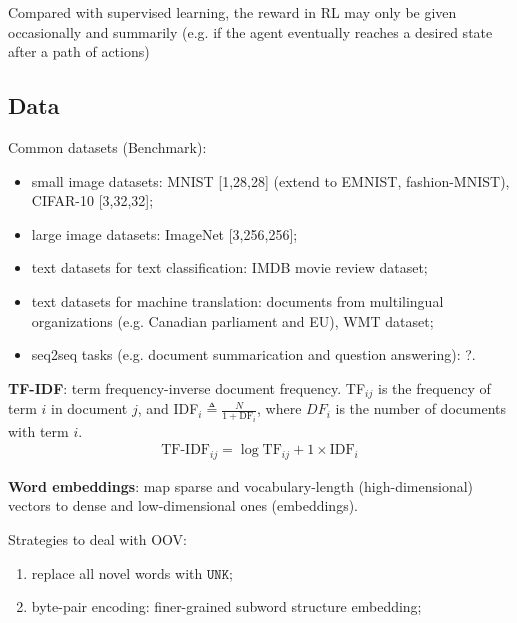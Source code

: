 Compared with supervised learning, the reward in RL may only be given occasionally and summarily
(e.g. if the agent eventually reaches a desired state after a path of actions)

\subsection{Data}

Common datasets (Benchmark):
\begin{itemize}
    \item small image datasets: MNIST [1,28,28] (extend to EMNIST, fashion-MNIST), CIFAR-10 [3,32,32];
    \item large image datasets: ImageNet [3,256,256];
    \item text datasets for text classification: IMDB movie review dataset;
    \item text datasets for machine translation: documents from multilingual organizations 
    (e.g. Canadian parliament and EU), WMT dataset;
    \item seq2seq tasks (e.g. document summarication and question answering): ?.
\end{itemize}

\textbf{TF-IDF}: term frequency-inverse document frequency.
TF$_{ij}$ is the frequency of term $i$ in document $j$, and 
IDF$_i\triangleq{\frac{N}{1+\text{DF}_i}}$, 
where $DF_i$ is the number of documents with term $i$.
\begin{gather}
    \text{TF-IDF}_{ij}=\log{\text{TF}_{ij}+1}\times\text{IDF}_i
\end{gather}

\textbf{Word embeddings}: 
map sparse and vocabulary-length (high-dimensional) vectors to 
dense and low-dimensional ones (embeddings).

Strategies to deal with OOV:
\begin{enumerate}
    \item replace all novel words with $\mathtt{UNK}$;
    \item byte-pair encoding: finer-grained subword structure embedding;
\end{enumerate}

